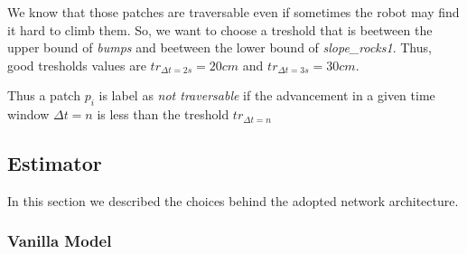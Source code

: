 \documentclass[../document.tex]{subfiles}
\begin{document}
We know that those patches are traversable even if sometimes the robot may find it hard to climb them. So, we want to choose a treshold that is beetween the upper bound of \emph{bumps} and beetween the lower bound of \emph{slope\_rocks1}. Thus, good tresholds values are $tr_{\Delta t = 2s} = 20cm$ and $tr_{\Delta t = 3s} = 30cm$. 

Thus a patch $p_i$ is label as \emph{not traversable} if the advancement in a given time window $\Delta t = n$ is less than the treshold $tr_{\Delta t = n}$

\subsection{Estimator}
\label{sec: estimator}
In this section we described the choices behind the adopted network architecture.
\subsubsection{Vanilla Model}
\end{document}
